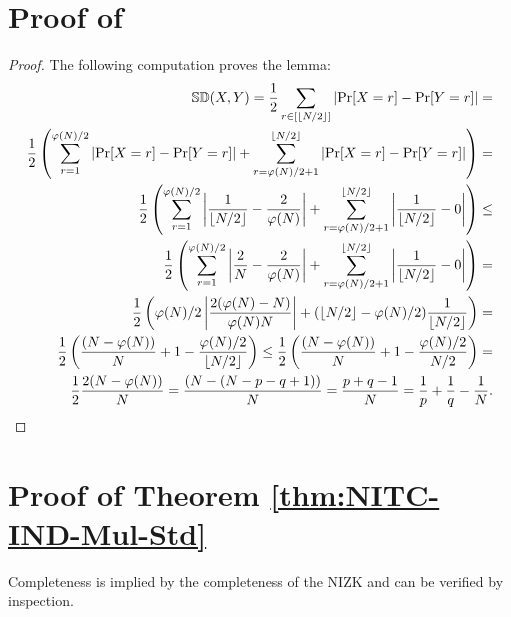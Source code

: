 \section{Proof of  }\label{proof:smpl-lemma}
\primelemma*


\begin{proof}
The following computation proves the lemma:
\begin{align*}
\mathbb{SD}(X, Y) = \frac{1}{2} \sum_{r \in [\left\lfloor N/2 \right\rfloor]} \left| \Pr[X = r] - \Pr[Y = r] \right| = \\ 
\frac{1}{2} \left( \sum_{r = 1}^{\varphi(N)/2} \left| \Pr[X = r] - \Pr[Y = r] \right| + \sum_{r = \varphi(N)/2+1}^{\left\lfloor N/2 \right\rfloor} \left| \Pr[X = r] - \Pr[Y = r] \right| \right) = 
\\
\frac{1}{2} \left( \sum_{r = 1}^{\varphi(N)/2} \left| \frac{1}{\left\lfloor N/2 \right\rfloor} - \frac{2}{\varphi(N)} \right| + \sum_{r = \varphi(N)/2+1}^{\left\lfloor N/2 \right\rfloor} \left| \frac{1}{\left\lfloor N/2 \right\rfloor} - 0 \right| \right) \leq \\
\frac{1}{2} \left( \sum_{r = 1}^{\varphi(N)/2} \left| \frac{2}{N} - \frac{2}{\varphi(N)} \right| + \sum_{r = \varphi(N)/2+1}^{\left\lfloor N/2 \right\rfloor} \left| \frac{1}{\left\lfloor N/2 \right\rfloor} - 0 \right| \right) = \\
\frac{1}{2} \left( \varphi(N)/2 \left| \frac{2(\varphi(N) - N)}{\varphi(N)N} \right| + (\left\lfloor N/2 \right\rfloor-\varphi(N)/2) \frac{1}{\left\lfloor N/2 \right\rfloor} \right) = \\
 \frac{1}{2} \left(\frac{(N-\varphi(N))}{N} + 1 - \frac{\varphi(N)/2}{{\left\lfloor N/2 \right\rfloor}} \right) \leq 
\frac{1}{2} \left(\frac{(N-\varphi(N))}{N} + 1 - \frac{\varphi(N)/2}{{N/2}} \right) = \\
 \frac{1}{2}\frac{2(N-\varphi(N))}{N} = 
\frac{(N-(N-p-q+1))}{N} = \frac{p+q-1}{N} = \frac{1}{p}+\frac{1}{q}-\frac{1}{N}.
\end{align*}
\end{proof}



\section{Proof of Theorem \ref{thm:NITC-IND-Mul-Std}} %
\label{app:NITC-IND-Mul-Std}


Completeness is implied by the completeness of the NIZK and can be verified by inspection. 



